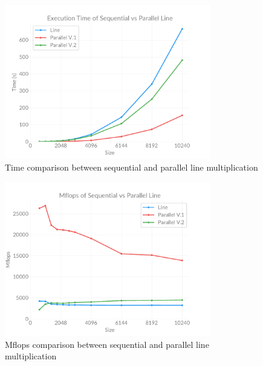     \begin{figure}[ht]
        \centering
        \captionsetup{justification=centering, margin=2cm}
        \includegraphics[width=0.8\textwidth]{pdf/parallel-time}
        \caption{Time comparison between sequential and parallel line multiplication}
        \label{fig:chart:parallel-time}
    \end{figure}

    \begin{figure}[ht]
        \centering
        \captionsetup{justification=centering, margin=2cm}
        \includegraphics[width=0.8\textwidth]{pdf/parallel-flops}
        \caption{Mflops comparison between sequential and parallel line multiplication}
        \label{fig:chart:parallel-flops}
    \end{figure}


